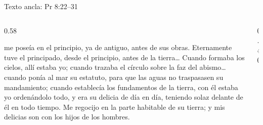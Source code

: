 \begin{frame}{Texto ancla: Pr 8:22--31}
\begin{columns}[c,onlytextwidth]
\begin{column}{0.58\textwidth}
\begin{cita}[fontupper=\scriptsize\itshape]\SENOR{} me poseía en el principio, ya de antiguo, antes de sus obras. Eternamente tuve el principado, desde el principio, antes de la tierra\ldots{} Cuando formaba los cielos, allí estaba yo; cuando trazaba el círculo sobre la faz del abismo\ldots{} cuando ponía al mar su estatuto, para que las aguas no traspasasen su mandamiento; cuando establecía los fundamentos de la tierra, con él estaba yo ordenándolo todo, y era su delicia de día en día, teniendo solaz delante de él en todo tiempo. Me regocijo en la parte habitable de su tierra; y mis delicias son con los hijos de los hombres.\end{cita}
\end{column}
\begin{column}{0.40\textwidth}\end{column}
\end{columns}
\end{frame}

